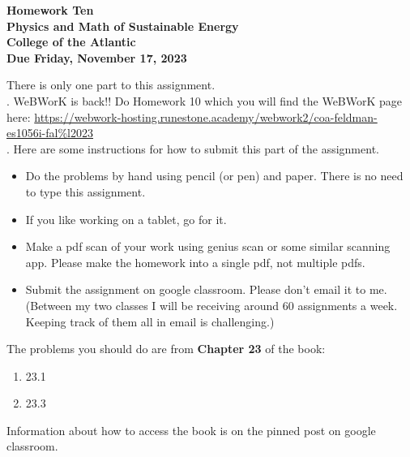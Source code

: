 \documentclass[12pt]{article}
\begin{document}
\pagestyle{empty}
 
\begin{center}
{\LARGE {\bf Homework Ten}}\\
\bigskip
{\Large {\bf Physics and Math of Sustainable Energy}}\\
\bigskip
{\Large {\bf College of the Atlantic}}\\
\bigskip
{ {\bf Due Friday, November 17, 2023}}\\ 
\end{center}
\medskip


\noindent There is only one part to this assignment.\\

.
WeBWorK is back!! Do Homework 10 which you will find the WeBWorK page here:
\url{https://webwork-hosting.runestone.academy/webwork2/coa-feldman-es1056i-fal%l2023} \\


.  Here are some
instructions for how to submit this part of the assignment.
\begin{itemize}
\item Do the problems by hand using pencil (or pen) and paper.
  There is no need to type this assignment.
\item If you like working on a tablet, go for it. 
\item Make a pdf scan of your work using genius scan or some
  similar scanning app.  Please make the homework into a single
  pdf, not multiple pdfs.
\item Submit the assignment on google classroom.  Please don't
  email it to me.  (Between my two classes I will be receiving
  around 60 assignments a week.  Keeping track of them all in email 
  is challenging.)\\
\end{itemize}



\noindent The problems you should do are from {\bf Chapter 23} 
of the book:  \\  


\begin{enumerate}
  \setlength{\itemsep}{-1mm}
\item 23.1
\item 23.3
\end{enumerate}



\noindent Information about how to access the book is on the
pinned post on google classroom. 
\end{document}
